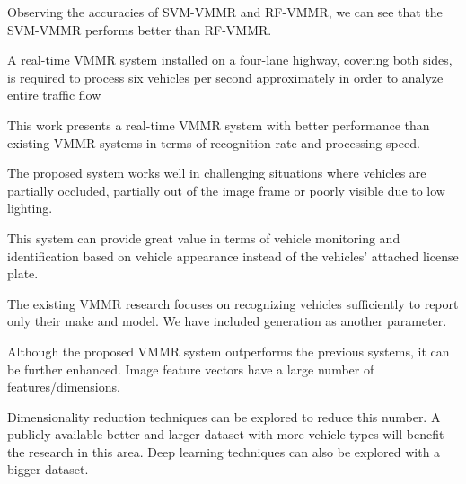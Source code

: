 Observing the accuracies
of SVM-VMMR and RF-VMMR, we can see that the SVM-VMMR performs better than RF-VMMR. 


A
real-time VMMR system installed on a four-lane highway, covering both sides, is required to process six
vehicles per second approximately in order to analyze entire traffic flow



This work presents a real-time VMMR system with better performance than existing VMMR systems
in terms of recognition rate and processing speed.

The proposed system works well in challenging
situations where vehicles are partially occluded, partially out of the image frame or poorly visible due to
low lighting. 

This system can provide great value in terms of vehicle monitoring and identification based
on vehicle appearance instead of the vehicles’ attached license plate. 

The existing VMMR research focuses
on recognizing vehicles sufficiently to report only their make and model. We have included generation as
another parameter. 

Although the proposed VMMR system outperforms the previous systems, it can be further enhanced.
Image feature vectors have a large number of features/dimensions. 

Dimensionality reduction techniques
can be explored to reduce this number. A publicly available better and larger dataset with more vehicle
types will benefit the research in this area. Deep learning techniques can also be explored with a bigger
dataset.